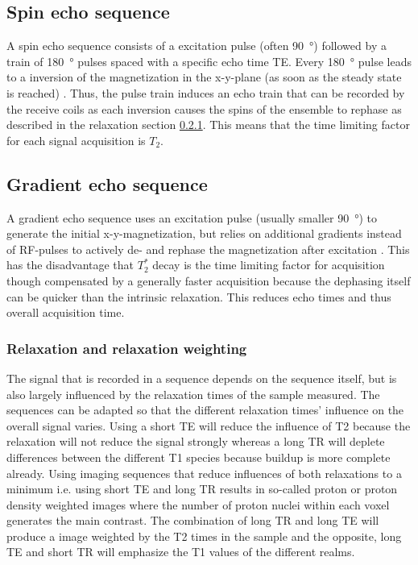         \subsection{Spin echo sequence}
            A spin echo sequence consists of a excitation pulse (often \SI{90}{\degree}) followed by a train of \SI{180}{\degree} pulses spaced with a specific echo time TE. Every 180\SI{}{\degree} pulse leads to a inversion of the magnetization in the x-y-plane (as soon as the steady state is reached) \cite{brown_mri_2005}. Thus, the pulse train induces an echo train that can be recorded by the receive coils as each inversion causes the spins of the ensemble to rephase as described in the relaxation section \ref{sec:theory:relaxation}. This means that the time limiting factor for each signal acquisition is $T_2$. 
        \subsection{Gradient echo sequence}
        \label{sec:theory:gradientEcho}
            A gradient echo sequence uses an excitation pulse (usually smaller \SI{90}{\degree}) to generate the initial x-y-magnetization, but relies on additional gradients instead of RF-pulses to actively de- and rephase the magnetization  after excitation \cite{brown_mri_2005}. This has the disadvantage that $T_2^*$ decay is the time limiting factor for acquisition though compensated by a generally faster acquisition because the dephasing itself can be quicker than the intrinsic relaxation. This reduces echo times and thus overall acquisition time.
        \subsubsection{Relaxation and relaxation weighting}
        \label{sec:theory:relaxation}
        The signal that is recorded in a sequence depends on the sequence itself, but is also largely influenced by the relaxation times of the sample measured. The sequences can be adapted so that the different relaxation times' influence on the overall signal varies. Using a short TE will reduce the influence of T2 because the relaxation will not reduce the signal strongly whereas a long TR will deplete differences between the different T1 species because buildup is more complete already. Using imaging sequences that reduce influences of both relaxations to a minimum i.e. using short TE and long TR results in so-called proton or proton density weighted images where the number of proton nuclei within each voxel generates the main contrast. The combination of long TR and long TE will produce a image weighted by the T2 times in the sample and the opposite, long TE and short TR will emphasize the T1 values of the different realms.
